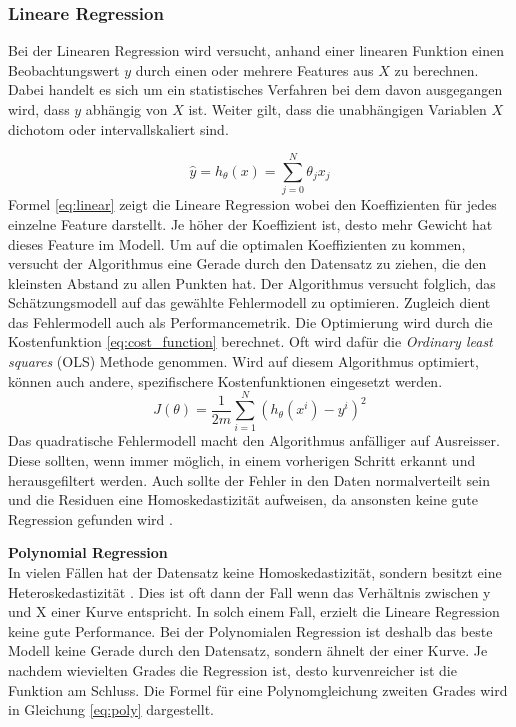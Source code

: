 \subsubsection{Lineare Regression}
Bei der Linearen Regression wird versucht, anhand einer linearen Funktion einen Beobachtungswert $y$ durch einen oder mehrere Features aus $X$ zu berechnen. Dabei handelt es sich um ein statistisches Verfahren bei dem davon ausgegangen wird, dass $y$ abhängig von $X$ ist. Weiter gilt, dass die unabhängigen Variablen $X$ dichotom oder intervallskaliert sind.

\begin{equation}
\label{eq:linear}
\hat{y} = h_\theta(x) = \sum_{j=0}^{N} \theta_j x_j
\end{equation}
Formel \eqref{eq:linear} zeigt die Lineare Regression wobei  den Koeffizienten für jedes einzelne Feature darstellt. Je höher der Koeffizient ist, desto mehr Gewicht hat dieses Feature im Modell. Um auf die optimalen Koeffizienten zu kommen, versucht der Algorithmus eine Gerade durch den Datensatz zu ziehen, die den kleinsten Abstand zu allen Punkten hat. Der Algorithmus versucht folglich, das Schätzungsmodell auf das gewählte Fehlermodell zu optimieren. Zugleich dient das Fehlermodell auch als Performancemetrik. Die Optimierung wird durch die Kostenfunktion \eqref{eq:cost_function} berechnet. Oft wird dafür die \textit{Ordinary least squares} (OLS) Methode genommen. Wird auf diesem Algorithmus optimiert, können auch andere, spezifischere Kostenfunktionen eingesetzt werden.\\
\begin{equation}
\label{eq:cost_function}
J(\theta) = \frac{1}{2m} \sum_{i=1}^{N} (h_\theta(x^i) - y^i)^2
\end{equation}
Das quadratische Fehlermodell macht den Algorithmus anfälliger auf Ausreisser. Diese sollten, wenn immer möglich, in einem vorherigen Schritt erkannt und herausgefiltert werden. Auch sollte der Fehler in den Daten normalverteilt sein und die Residuen eine Homoskedastizität aufweisen, da ansonsten keine gute Regression gefunden wird \cite{gradient_descent, gradient_descent_2, gradient_descent_3}.

\textbf{Polynomial Regression}\\
In vielen Fällen hat der Datensatz keine Homoskedastizität, sondern besitzt eine Heteroskedastizität \cite{poly}. Dies ist oft dann der Fall wenn das Verhältnis zwischen y und X einer Kurve entspricht. In solch einem Fall, erzielt die Lineare Regression keine gute Performance.
Bei der Polynomialen Regression ist deshalb das beste Modell keine Gerade durch den Datensatz, sondern ähnelt der einer Kurve. Je nachdem wievielten Grades die Regression ist, desto kurvenreicher ist die Funktion am Schluss. Die Formel für eine Polynomgleichung zweiten Grades wird in Gleichung \eqref{eq:poly} dargestellt.

